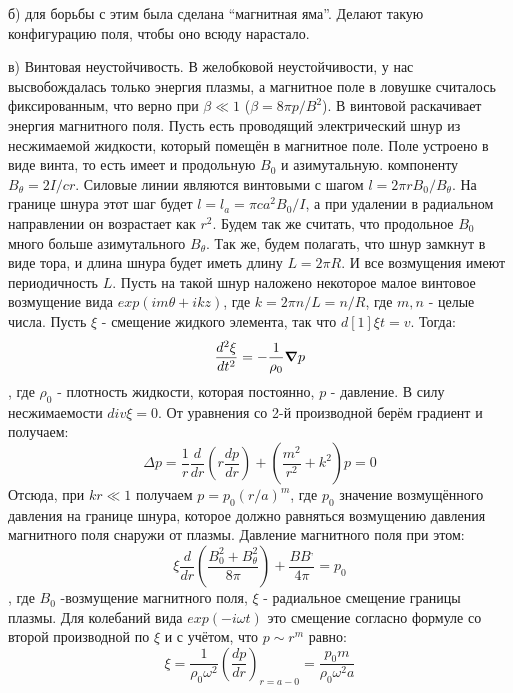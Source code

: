 \documentclass[10pt, a4paper]{article}
\begin{document}
б) для борьбы с этим была сделана “магнитная яма”. Делают такую конфигурацию поля, чтобы оно всюду нарастало.

в) Винтовая неустойчивость. В желобковой неустойчивости, у нас высвобождалась только энергия плазмы, а магнитное поле в ловушке считалось фиксированным, что верно при $\beta \ll 1$ ($\beta=8 \pi p / B^2$). В винтовой раскачивает энергия магнитного поля.
Пусть есть проводящий электрический шнур из несжимаемой жидкости, который помещён в магнитное поле. Поле устроено в виде винта, то есть имеет и продольную $B_0$ и азимутальную. компоненту $B_{\theta} = 2I/cr$. Силовые линии являются винтовыми с шагом $l=2 \pi r B_0 / B_{\theta}$. На границе шнура этот шаг будет $l=l_a=\pi c a^2 B_0 /I$, а при удалении в радиальном направлении он возрастает как $r^2$.
Будем так же считать, что продольное $B_0$ много больше азимутального $B_{\theta}$. Так же, будем полагать, что шнур замкнут в виде тора, и длина шнура будет иметь длину $L=2\pi R$. И все возмущения имеют периодичность $L$. Пусть на такой шнур наложено некоторое малое винтовое возмущение вида $exp(im \theta + ikz)$, где $k=2 \pi n/L=n/R$, где $m,n$ - целые числа. Пусть $\xi$ - смещение жидкого элемента, так что $d[1]{\xi}{t}=v$. Тогда:
\begin{equation}
\frac{d^{2}\xi}{dt^{2}}= - \frac{1}{\rho_0} \grad p
\end{equation}
, где $\rho_0$ -  плотность жидкости, которая постоянно, $p$ - давление. В силу несжимаемости $div \xi =0$. От уравнения со 2-й производной берём градиент и получаем:
\begin{equation}
\Delta p = \frac{1}{r} \frac{d}{dr} (r \frac{dp}{dr})+(\frac{m^2}{r^2}+k^2)p=0
\end{equation}
Отсюда, при $kr \ll 1$ получаем $p=p_0 (r/a)^{m}$, где $p_0$ значение возмущённого давления на границе шнура, которое должно равняться возмущению давления магнитного поля снаружи от плазмы. Давление магнитного поля при этом:
\begin{equation}
\xi \frac{d}{dr}(\frac{B^2_0+B^2_{\theta}}{8 \pi}) + \frac{B B^{,}}{4 \pi}=p_0
\end{equation}
, где $B_0$ -возмущение магнитного поля, $\xi$ - радиальное смещение границы плазмы. Для колебаний вида $exp(-i \omega t)$ это смещение согласно формуле со второй производной по $\xi$ и с учётом, что $p \sim r^{m}$ равно:
\begin{equation}
\xi = \frac{1}{\rho_0 \omega^2} (\frac{dp}{dr})_{r=a-0}= \frac{p_0 m}{\rho_0 \omega^2 a}
\end{equation}
\end{document}
